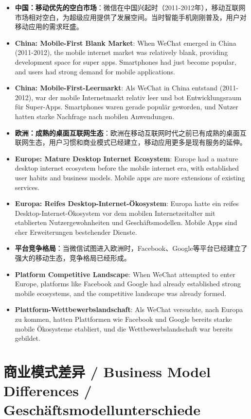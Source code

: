\documentclass[11pt,a4paper]{article}
\begin{document}
\begin{itemize}
    \item \textbf{中国：移动优先的空白市场}：微信在中国兴起时（2011-2012年），移动互联网市场相对空白，为超级应用提供了发展空间。当时智能手机刚刚普及，用户对移动应用的需求旺盛。
    \item \textbf{China: Mobile-First Blank Market}: When WeChat emerged in China (2011-2012), the mobile internet market was relatively blank, providing development space for super apps. Smartphones had just become popular, and users had strong demand for mobile applications.
    \item \textbf{China: Mobile-First-Leermarkt}: Als WeChat in China entstand (2011-2012), war der mobile Internetmarkt relativ leer und bot Entwicklungsraum für Super-Apps. Smartphones waren gerade populär geworden, und Nutzer hatten starke Nachfrage nach mobilen Anwendungen.
    
    \item \textbf{欧洲：成熟的桌面互联网生态}：欧洲在移动互联网时代之前已有成熟的桌面互联网生态，用户习惯和商业模式已经建立，移动应用更多是现有服务的延伸。
    \item \textbf{Europe: Mature Desktop Internet Ecosystem}: Europe had a mature desktop internet ecosystem before the mobile internet era, with established user habits and business models. Mobile apps are more extensions of existing services.
    \item \textbf{Europa: Reifes Desktop-Internet-Ökosystem}: Europa hatte ein reifes Desktop-Internet-Ökosystem vor dem mobilen Internetzeitalter mit etablierten Nutzergewohnheiten und Geschäftsmodellen. Mobile Apps sind eher Erweiterungen bestehender Dienste.
    
    \item \textbf{平台竞争格局}：当微信试图进入欧洲时，Facebook、Google等平台已经建立了强大的移动生态，竞争格局已经形成。
    \item \textbf{Platform Competitive Landscape}: When WeChat attempted to enter Europe, platforms like Facebook and Google had already established strong mobile ecosystems, and the competitive landscape was already formed.
    \item \textbf{Plattform-Wettbewerbslandschaft}: Als WeChat versuchte, nach Europa zu kommen, hatten Plattformen wie Facebook und Google bereits starke mobile Ökosysteme etabliert, und die Wettbewerbslandschaft war bereits gebildet.
\end{itemize}

\section{商业模式差异 / Business Model Differences / Geschäftsmodellunterschiede}
\end{document}
